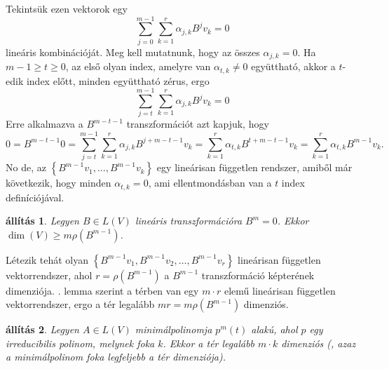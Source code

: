 \documentclass[a4paper, showtrims]{memoir}
\makeatletter
\renewenvironment{proof}[1][\proofname]
    {\par\pushQED{\qed}%
    \normalfont \topsep6\p@\@plus6\p@\relax
    \trivlist
    \item[\hskip\labelsep
        \itshape
    #1\@addpunct{:}]\ignorespaces}
    {\popQED\endtrivlist\@endpefalse}
\theoremstyle{plain}
\newtheorem{proposition}{állítás}[chapter]
\theoremstyle{remark}
\theoremstyle{definition}
\makeatother
\begin{document}
\begin{proof}
	Tekintsük ezen vektorok egy
	\[
		\sum_{j=0}^{m-1}\sum_{k=1}^r\alpha_{j,k}B^jv_k=0
	\]
	lineáris kombinációját.
	Meg kell mutatnunk, hogy az összes $\alpha_{j,k}=0$.
	Ha $m-1\geq t\geq 0$, az első olyan index, amelyre van $\alpha_{t,k}\neq 0$
	együttható, akkor a $t$-edik index előtt,
	minden együttható zérus, ergo
	\[
		\sum_{j=t}^{m-1}\sum_{k=1}^r\alpha_{j,k}B^jv_k=0
	\]
	Erre alkalmazva a $B^{m-t-1}$ transzformációt azt kapjuk, hogy
	\[
		0
		=
		B^{m-t-1}0
		=
		\sum_{j=t}^{m-1}\sum_{k=1}^r\alpha_{j,k}B^{j+m-t-1}v_k
		=
		\sum_{k=1}^r\alpha_{t,k}B^{t+m-t-1}v_k
		=
		\sum_{k=1}^r\alpha_{t,k}B^{m-1}v_k.
	\]
	No de, az $\left\{ B^{m-1}v_1,\ldots,B^{m-1}v_k \right\}$ egy lineárisan független rendszer,
	amiből már következik,
	hogy minden $\alpha_{t,k}=0$,
	ami ellentmondásban van a $t$ index definíciójával.
\end{proof}
\begin{proposition}
	Legyen $B\in L\left( V \right)$ lineáris transzformációra $B^m=0$.
	Ekkor $\dim(V)\geq m\rho\left( B^{m-1} \right)$.
	\label{th:nildim}
\end{proposition}
\begin{proof}
	Létezik tehát olyan $\left\{ B^{m-1}v_1,B^{m-1}v_2,\ldots,B^{m-1}v_r \right\}$
	lineárisan független vektorrendszer, ahol $r=\rho(B^{m-1})$ a $B^{m-1}$ transzformáció képterének dimenziója.
    . lemma szerint a térben van egy $m\cdot r$ elemű lineárisan független vektorrendszer,
	ergo a tér legalább $mr=m\rho\left( B^{m-1} \right)$ dimenziós.
\end{proof}
\begin{proposition}
	Legyen $A\in L\left( V \right)$ minimálpolinomja
	$
		p^{m}\left( t \right)
	$
	alakú,
	ahol $p$ egy irreducibilis polinom, melynek foka $k$.
	Ekkor a tér legalább $m\cdot k$ dimenziós
	(, azaz a minimálpolinom foka legfeljebb a tér dimenziója).
	\label{th:minpol1}
\end{proposition}
\end{document}
